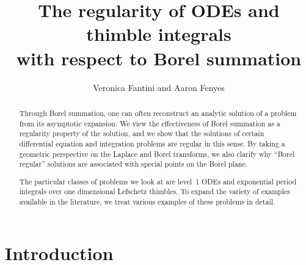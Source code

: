 \documentclass{article}
\title{The regularity of ODEs and thimble integrals \\
with respect to Borel summation}
\author{Veronica Fantini and Aaron Fenyes}
\date{}
\theoremstyle{definition}
\theoremstyle{plain}
\begin{document}
\maketitle

\begin{abstract}
Through Borel summation, one can often reconstruct an analytic solution of a problem from its asymptotic expansion. We view the effectiveness of Borel summation as a regularity property of the solution, and we show that the solutions of certain differential equation and integration problems are regular in this sense. By taking a geometric perspective on the Laplace and Borel transforms, we also clarify why ``Borel regular'' solutions are associated with special points on the Borel plane.

The particular classes of problems we look at are level~1 ODEs and exponential period integrals over one dimensional Lefschetz thimbles. To expand the variety of examples available in the literature, we treat various examples of these problems in detail.
\end{abstract}
\tableofcontents
%
\section{Introduction}
%
\end{document}
